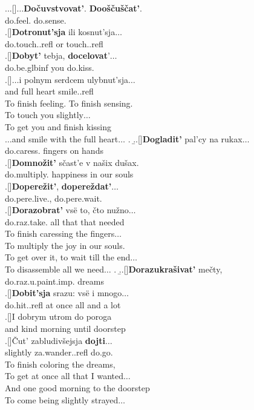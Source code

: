\ex.\label{ex:poem}\a.\label{poem:a}\ag.[]$\ldots$\textbf{Do\v{c}uvstvovat'}. \textbf{Doo\v{s}\v{c}u\v{s}\v{c}at'}.\\
do.feel. do.sense.\\
\bg.[]\textbf{Dotronut'sja} ili kosnut'sja$\ldots$\\
do.touch..refl or touch..refl\\
\bg.[]\textbf{Dobyt'} tebja, \textbf{docelovat}'$\ldots$\\
do.be.glb{inf} you do.kiss.\\
\bg.[]$\ldots$i polnym serdcem ulybnut'sja$\ldots$\\
and full heart smile..refl\\
\trans To finish feeling. To finish sensing.\\
To touch you slightly$\ldots$\\
To get you and finish kissing\\
$\ldots$and smile with the full heart$\ldots$
\z.
\b.\label{poem:b}\ag.[]\textbf{Dogladit'} pal'cy na rukax$\ldots$\\
do.caress. fingers on hands\\
\bg.[]\textbf{Domno\v{z}it'} s\v{c}ast'e v na\v{s}ix du\v{s}ax.\\
do.multiply. happiness in our souls\\
\bg.[]\textbf{Dopere\v{z}it'}, \textbf{dopere\v{z}dat'}$\ldots$\\
do.pere.live., do.pere.wait.\\
\bg.[]\textbf{Dorazobrat'} vs\"{e} to, \v{c}to nu\v{z}no$\ldots$ \\
do.raz.take. all that that needed\\
\trans To finish caressing the fingers$\ldots$\\
To multiply the joy in our souls.\\
To get over it, to wait till the end$\ldots$\\
To disassemble all we need$\ldots$
\z.
\b.\label{poem:c}\ag.[]\textbf{Dorazukra\v{s}ivat'} me\v{c}ty,\\
do.raz.u.paint.imp. dreams\\
\bg.[]\textbf{Dobit'sja} srazu: vs\"{e} i mnogo$\ldots$\\
do.hit..refl {at once} all and {a lot}\\
\bg.[]I dobrym utrom do poroga\\
and kind morning until doorstep\\
\bg.[]\v{C}ut' zabludiv\v{s}ejsja \textbf{dojti}$\ldots$\\
slightly za.wander..refl do.go.\\
\trans To finish coloring the dreams,\\
To get at once all that I wanted$\ldots$\\
And one good morning to the doorstep\\
To come being slightly strayed$\ldots$\\

